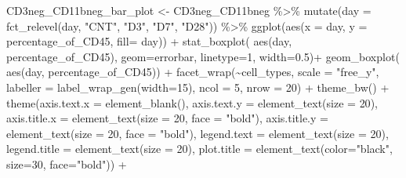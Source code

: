 \documentclass[
]{book}
\newenvironment{Shaded}{\begin{snugshade}}{\end{snugshade}}
\newcommand{\AttributeTok}[1]{\textcolor[rgb]{0.77,0.63,0.00}{#1}}
\newcommand{\DecValTok}[1]{\textcolor[rgb]{0.00,0.00,0.81}{#1}}
\newcommand{\FloatTok}[1]{\textcolor[rgb]{0.00,0.00,0.81}{#1}}
\newcommand{\FunctionTok}[1]{\textcolor[rgb]{0.00,0.00,0.00}{#1}}
\newcommand{\NormalTok}[1]{#1}
\newcommand{\OtherTok}[1]{\textcolor[rgb]{0.56,0.35,0.01}{#1}}
\newcommand{\SpecialCharTok}[1]{\textcolor[rgb]{0.00,0.00,0.00}{#1}}
\newcommand{\StringTok}[1]{\textcolor[rgb]{0.31,0.60,0.02}{#1}}
\begin{document}
\begin{Shaded}
\begin{Highlighting}[]
\NormalTok{CD3neg\_CD11bneg\_bar\_plot }\OtherTok{\textless{}{-}}\NormalTok{ CD3neg\_CD11bneg }\SpecialCharTok{\%\textgreater{}\%}
\FunctionTok{mutate}\NormalTok{(}\AttributeTok{day =} \FunctionTok{fct\_relevel}\NormalTok{(day, }
            \StringTok{"CNT"}\NormalTok{, }\StringTok{"D3"}\NormalTok{, }\StringTok{"D7"}\NormalTok{, }
            \StringTok{"D28"}\NormalTok{)) }\SpecialCharTok{\%\textgreater{}\%}
  \FunctionTok{ggplot}\NormalTok{(}\FunctionTok{aes}\NormalTok{(}\AttributeTok{x =}\NormalTok{ day, }\AttributeTok{y =}\NormalTok{ percentage\_of\_CD45, }\AttributeTok{fill=}\NormalTok{ day)) }\SpecialCharTok{+}
  \FunctionTok{stat\_boxplot}\NormalTok{( }\FunctionTok{aes}\NormalTok{(day, percentage\_of\_CD45), }
    \AttributeTok{geom=}\StringTok{\textquotesingle{}errorbar\textquotesingle{}}\NormalTok{, }\AttributeTok{linetype=}\DecValTok{1}\NormalTok{, }\AttributeTok{width=}\FloatTok{0.5}\NormalTok{)}\SpecialCharTok{+}  
  \FunctionTok{geom\_boxplot}\NormalTok{( }\FunctionTok{aes}\NormalTok{(day, percentage\_of\_CD45)) }\SpecialCharTok{+} 
  \FunctionTok{facet\_wrap}\NormalTok{(}\SpecialCharTok{\textasciitilde{}}\NormalTok{cell\_types, }\AttributeTok{scale =} \StringTok{"free\_y"}\NormalTok{, }\AttributeTok{labeller =} \FunctionTok{label\_wrap\_gen}\NormalTok{(}\AttributeTok{width=}\DecValTok{15}\NormalTok{), }\AttributeTok{ncol =} \DecValTok{5}\NormalTok{, }\AttributeTok{nrow =} \DecValTok{20}\NormalTok{) }\SpecialCharTok{+} 
  \FunctionTok{theme\_bw}\NormalTok{() }\SpecialCharTok{+} 
  \FunctionTok{theme}\NormalTok{(}\AttributeTok{axis.text.x =} \FunctionTok{element\_blank}\NormalTok{(), }\AttributeTok{axis.text.y =} \FunctionTok{element\_text}\NormalTok{(}\AttributeTok{size =} \DecValTok{20}\NormalTok{), }
        \AttributeTok{axis.title.x =} \FunctionTok{element\_text}\NormalTok{(}\AttributeTok{size =} \DecValTok{20}\NormalTok{, }\AttributeTok{face =} \StringTok{"bold"}\NormalTok{), }
        \AttributeTok{axis.title.y =} \FunctionTok{element\_text}\NormalTok{(}\AttributeTok{size =} \DecValTok{20}\NormalTok{, }\AttributeTok{face =} \StringTok{"bold"}\NormalTok{), }
        \AttributeTok{legend.text =} \FunctionTok{element\_text}\NormalTok{(}\AttributeTok{size =} \DecValTok{20}\NormalTok{), }
        \AttributeTok{legend.title =} \FunctionTok{element\_text}\NormalTok{(}\AttributeTok{size =} \DecValTok{20}\NormalTok{), }
        \AttributeTok{plot.title =} \FunctionTok{element\_text}\NormalTok{(}\AttributeTok{color=}\StringTok{"black"}\NormalTok{, }\AttributeTok{size=}\DecValTok{30}\NormalTok{, }\AttributeTok{face=}\StringTok{"bold"}\NormalTok{)) }\SpecialCharTok{+} 

\end{Highlighting}
\end{Shaded}
\end{document}

